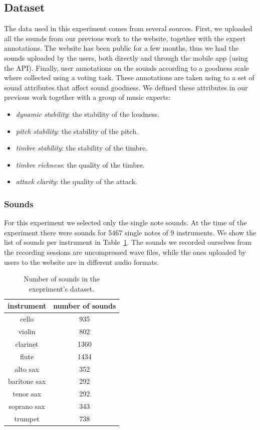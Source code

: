\documentclass{article}
\begin{document}
\subsection{Dataset}
The data used in this experiment comes from several sources. First, we uploaded all the sounds from our previous work to the website, together with the expert annotations. The website has been public for a few months, thus we had the sounds uploaded by the users, both directly and through the mobile app (using the API). Finally, user annotations on the sounds according to a goodness scale where collected using a voting task. These annotations are taken using to a set of sound attributes that affect sound goodness. We defined these attributes in our previous work together with a group of music experts:   
\begin{itemize}
	\item{\textit{dynamic stability}: the stability of the loudness.}
	\item{\textit{pitch stability}: the stability of the pitch.}
	\item{\textit{timbre stability}: the stability of the timbre.}
	\item{\textit{timbre richness}: the quality of the timbre.}
	\item{\textit{attack clarity}: the quality of the attack.}
\end{itemize}

\subsubsection{Sounds}
For this experiment we selected only the single note sounds. At the time of the experiment there were sounds for 5467 single notes of 9 instruments. We show the list of sounds per instrument in Table~\ref{sounds}. The sounds we recorded ourselves from the recording sessions are uncompressed wave files, while the ones uploaded by users to the website are in different audio formats.  

\begin{table}[ht]
\centering
\begin{tabular}{cc}
\hline
instrument   & number of sounds \\ \hline
cello        & 935              \\
violin       & 802              \\
clarinet     & 1360             \\
flute        & 1434             \\
alto sax     & 352              \\
baritone sax & 292              \\
tenor sax    & 292              \\
soprano sax  & 343              \\
trumpet      & 738              \\ \hline
\end{tabular}
\caption{Number of sounds in the exepriment's dataset.}
\label{sounds}
\end{table}
\end{document}
